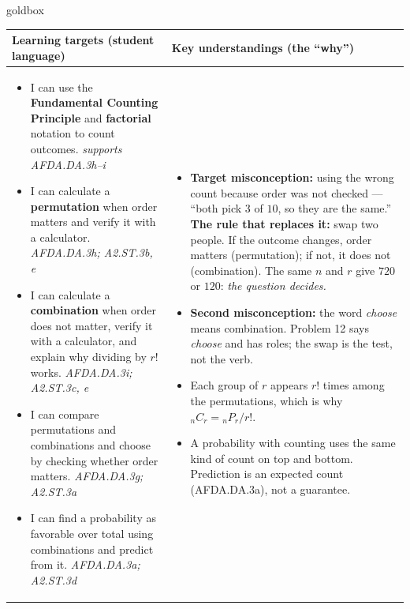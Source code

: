 \documentclass[10pt]{article}
\newcommand{\Pnr}[2]{{}_{#1}P_{#2}}
\newcommand{\Cnr}[2]{{}_{#1}C_{#2}}
\begin{document}
\renewcommand{\arraystretch}{1.4}
\boxguard
\begin{skillbox}{goldbox}
\begin{tabularx}{\linewidth}{@{}X|X@{}}
\textbf{Learning targets (student language)} & \textbf{Key understandings (the ``why'')} \\[2pt]
\hline
\vspace{-6pt}
\begin{itemize}[leftmargin=1.1em, nosep, after=\vspace{2pt}]
  \item I can use the \textbf{Fundamental Counting Principle} and \textbf{factorial} notation
        to count outcomes. \hfill \textit{supports AFDA.DA.3h--i}
  \item I can calculate a \textbf{permutation} when order matters and verify it with a
        calculator. \hfill \textit{AFDA.DA.3h; A2.ST.3b, e}
  \item I can calculate a \textbf{combination} when order does not matter, verify it with a
        calculator, and explain why dividing by $r!$ works.
        \hfill \textit{AFDA.DA.3i; A2.ST.3c, e}
  \item I can compare permutations and combinations and choose by checking whether order
        matters. \hfill \textit{AFDA.DA.3g; A2.ST.3a}
  \item I can find a probability as favorable over total using combinations and predict from
        it. \hfill \textit{AFDA.DA.3a; A2.ST.3d}
\end{itemize}
&
\vspace{-6pt}
\begin{itemize}[leftmargin=1.1em, nosep, after=\vspace{2pt}]
  \item \textbf{Target misconception:} using the wrong count because order was not checked ---
        ``both pick $3$ of $10$, so they are the same.'' \textbf{The rule that replaces it:}
        swap two people. If the outcome changes, order matters (permutation); if not, it does
        not (combination). The same $n$ and $r$ give $720$ or $120$: \emph{the question
        decides.}
  \item \textbf{Second misconception:} the word \emph{choose} means combination. Problem 12
        says \emph{choose} and has roles; the swap is the test, not the verb.
  \item Each group of $r$ appears $r!$ times among the permutations, which is why
        $\Cnr{n}{r} = \Pnr{n}{r} / r!$.
  \item A probability with counting uses the same kind of count on top and bottom. Prediction
        is an expected count (AFDA.DA.3a), not a guarantee.
\end{itemize}
\end{tabularx}
\end{skillbox}
\end{document}
